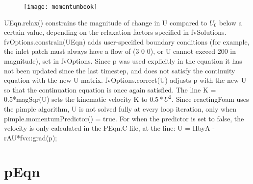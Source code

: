 \begin{figure}[H]
\centering
\texttt{[image: momentumbook]}
\end{figure}

UEqn.relax() constrains the magnitude of change in U compared to $U_0$ below a certain value, depending on the relaxation factors specified in fvSolutions.
\vspace{\baselineskip}
fvOptions.constrain(UEqn) adds user-specified boundary conditions (for example, the inlet patch must always have a flow of (3 0 0), or U cannot exceed 200 in magnitude), set in fvOptions.
\vspace{\baselineskip}
Since p was used explicitly in the equation it has not been updated since the last timestep, and does not satisfy the continuity equation with the new U matrix. fvOptions.correct(U) adjusts p with the new U so that the continuation equation is once again satisfied. 
\vspace{\baselineskip}
The line K = 0.5*magSqr(U) sets the kinematic velocity K to $0.5*U^2$.
\vspace{\baselineskip}
Since reactingFoam uses the pimple algorithm, U is not solved fully at every loop iteration, only when pimple.momentumPredictor() = true. For when the predictor is set to false, the velocity is only calculated in the PEqn.C file, at the line:
\vspace{\baselineskip}
U = HbyA - rAU*fvc::grad(p);

\section{pEqn}

